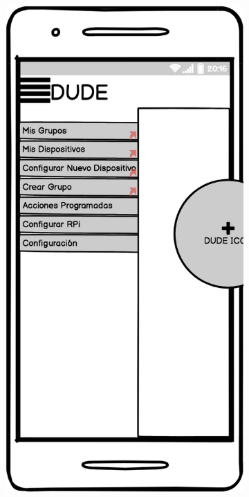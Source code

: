 \begin{figure}[H]
\begin{subfigure}[b]{0.20\textwidth}
    \label{fig:balsamiq}
  \end{subfigure}
  \begin{subfigure}[b]{0.20\textwidth}
    \includegraphics[width=\textwidth, keepaspectratio]{images/balsamiq09}

\end{subfigure}
\end{figure}
